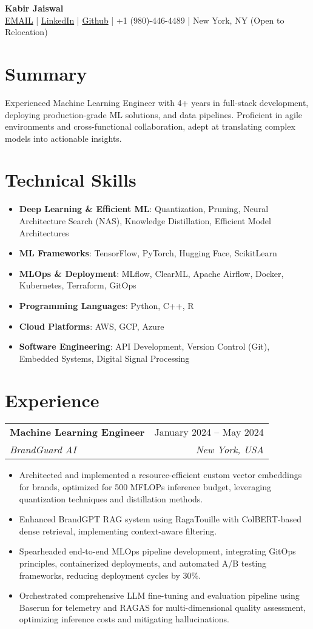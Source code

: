 \documentclass[10pt,letterpaper]{article}
\makeatletter
\newcommand{\resumeItem}[2]{
  \item\small{
    \textbf{#1}{: #2 \vspace{-4pt}}
  }
}
\newcommand{\resumeSubheading}[4]{
  \vspace{-5pt}
    \begin{tabular*}{0.97\textwidth}{l@{\extracolsep{\fill}}r}
      \textbf{#1} & #2 \\
      \textit{\small#3} & \textit{\small #4} \\
    \end{tabular*}\vspace{-4pt}
}
\newcommand{\resumeSubHeadingListStart}{\begin{itemize}[leftmargin=*]}
\newcommand{\resumeSubHeadingListEnd}{\end{itemize}}
\newcommand{\resumeItemListStart}{\begin{itemize}}
\newcommand{\resumeItemListEnd}{\end{itemize}}
\makeatother
\begin{document}
\begin{center}
  \textbf{\Large Kabir Jaiswal} \\

  \href{mailto:kabirjaiswal900@gmail.com}{EMAIL} |
  \href{https://www.linkedin.com/in/kabir-j}{LinkedIn} |
  \href{https://github.com/kabir12345}{Github} |
  +1 (980)-446-4489 |
  New York, NY (Open to Relocation)
\end{center}

\section{Summary}
Experienced Machine Learning Engineer with 4+ years in full-stack development, deploying production-grade ML solutions, and data pipelines.
Proficient in agile environments and cross-functional collaboration, adept at translating complex models into actionable insights.

\section{Technical Skills}
\resumeSubHeadingListStart
    \resumeItem{Deep Learning \& Efficient ML}{Quantization, Pruning, Neural Architecture Search (NAS), Knowledge Distillation, Efficient Model Architectures}
    \resumeItem{ML Frameworks}{TensorFlow, PyTorch, Hugging Face, ScikitLearn}
    \resumeItem{MLOps \& Deployment}{MLflow, ClearML, Apache Airflow, Docker, Kubernetes, Terraform, GitOps}
    \resumeItem{Programming Languages}{Python, C++, R}
    \resumeItem{Cloud Platforms}{AWS, GCP, Azure}
    \resumeItem{Software Engineering}{API Development, Version Control (Git), Embedded Systems, Digital Signal Processing}
\resumeSubHeadingListEnd

\section{Experience}
\vspace{1pt}
\resumeSubheading
  {Machine Learning Engineer}{January 2024 – May 2024}
  {BrandGuard AI}{New York, USA}
\resumeItemListStart
    \item Architected and implemented a resource-efficient custom vector embeddings for brands, optimized for 500 MFLOPs inference budget, leveraging quantization techniques and distillation methods.
    \item Enhanced BrandGPT RAG system using RagaTouille  with ColBERT-based dense retrieval, implementing context-aware filtering.
    \item Spearheaded end-to-end MLOps pipeline development, integrating GitOps principles, containerized deployments, and automated A/B testing frameworks, reducing deployment cycles by 30\%.
    \item Orchestrated comprehensive LLM fine-tuning and evaluation pipeline using Baserun for telemetry and RAGAS for multi-dimensional quality assessment, optimizing inference costs and mitigating hallucinations.
\resumeItemListEnd
\end{document}
